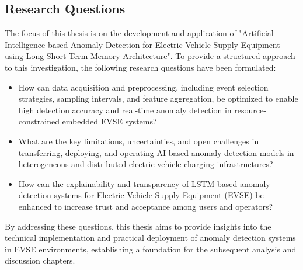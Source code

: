 \subsection{Research Questions}

The focus of this thesis is on the development and application of "Artificial Intelligence-based Anomaly Detection for Electric Vehicle Supply Equipment using Long Short-Term Memory Architecture". To provide a structured approach to this investigation, the following research questions have been formulated:

\begin{itemize}
    \item How can data acquisition and preprocessing, including event selection strategies, sampling intervals, and feature aggregation, be optimized to enable high detection accuracy and real-time anomaly detection in resource-constrained embedded EVSE systems?
    \item What are the key limitations, uncertainties, and open challenges in transferring, deploying, and operating AI-based anomaly detection models in heterogeneous and distributed electric vehicle charging infrastructures?
    \item How can the explainability and transparency of LSTM-based anomaly detection systems for Electric Vehicle Supply Equipment (EVSE) be enhanced to increase trust and acceptance among users and operators?
\end{itemize}

By addressing these questions, this thesis aims to provide insights into the technical implementation and practical deployment of anomaly detection systems in EVSE environments, establishing a foundation for the subsequent analysis and discussion chapters.
